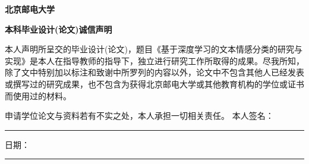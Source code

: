 \begin{center}
\textbf{\songti{}北京邮电大学}  
\end{center}

\begin{center}
\textbf{\songti{} 本科毕业设计(论文)诚信声明}
\end{center}
\songti{}

本人声明所呈交的毕业设计(论文)，题目《基于深度学习的文本情感分类的研究与实现》是本人在指导教师的指导下，独立进行研究工作所取得的成果。尽我所知，除了文中特别加以标注和致谢中所罗列的内容以外，论文中不包含其他人已经发表或撰写过的研究成果，也不包含为获得北京邮电大学或其他教育机构的学位或证书而使用过的材料。

申请学位论文与资料若有不实之处，本人承担一切相关责任。  \newline
\indent 本人签名：\rule[-2pt]{4cm}{0.5pt}\quad 日期：\rule[-2pt]{4cm}{0.5pt}

